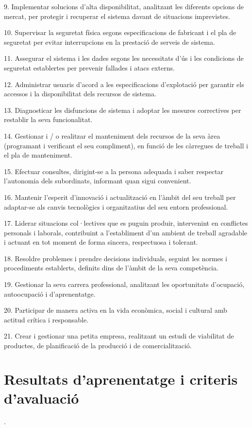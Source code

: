 \documentclass[catalan, a4paper, 12pt, titlepage]{article}
\begin{document}
9. Implementar solucions d'alta disponibilitat, analitzant les diferents opcions de mercat, per protegir i recuperar el sistema davant de situacions imprevistes.

10. Supervisar la seguretat física segons especificacions de fabricant i el pla de seguretat per evitar interrupcions en la prestació de serveis de sistema.

11. Assegurar el sistema i les dades segons les necessitats d'ús i les condicions de seguretat establertes per prevenir fallades i atacs externs.

12. Administrar usuaris d'acord a les especificacions d'explotació per garantir els accessos i la disponibilitat dels recursos de sistema.

13. Diagnosticar les disfuncions de sistema i adoptar les mesures correctives per restablir la seva funcionalitat.

14. Gestionar i / o realitzar el manteniment dels recursos de la seva àrea (programant i verificant el seu compliment), en funció de les càrregues de treball i el pla de manteniment.

15. Efectuar consultes, dirigint-se a la persona adequada i saber respectar l'autonomia dels subordinats, informant quan sigui convenient.

16. Mantenir l'esperit d'innovació i actualització en l'àmbit del seu treball per adaptar-se als canvis tecnològics i organitzatius del seu entorn professional.

17. Liderar situacions col·lectives que es puguin produir, intervenint en conflictes personals i laborals, contribuint a l'establiment d'un ambient de treball agradable i actuant en tot moment de forma sincera, respectuosa i tolerant.

18. Resoldre problemes i prendre decisions individuals, seguint les normes i procediments establerts, definits dins de l'àmbit de la seva competència.

19. Gestionar la seva carrera professional, analitzant les oportunitats d'ocupació, autoocupació i d'aprenentatge.

20. Participar de manera activa en la vida econòmica, social i cultural amb actitud crítica i responsable.

21. Crear i gestionar una petita empresa, realitzant un estudi de viabilitat de productes, de planificació de la producció i de comercialització.

\section{Resultats d'aprenentatge i criteris d'avaluació}
\label{ref:resultats}.
\end{document}
